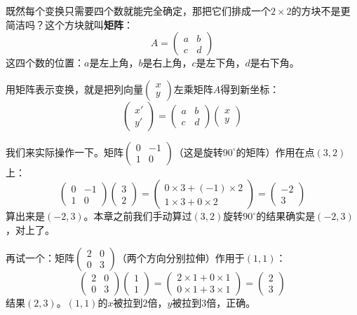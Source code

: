 \documentclass[a4paper,12pt]{ctexart}
\begin{document}
既然每个变换只需要四个数就能完全确定，那把它们排成一个$2\times2$的方块不是更简洁吗？这个方块就叫\textbf{矩阵}：
\[
A = \begin{pmatrix}a&b\\c&d\end{pmatrix}
\]
这四个数的位置：$a$是左上角，$b$是右上角，$c$是左下角，$d$是右下角。

用矩阵表示变换，就是把列向量$\begin{pmatrix}x\\y\end{pmatrix}$左乘矩阵$A$得到新坐标：
\[
\begin{pmatrix}x'\\y'\end{pmatrix}
= \begin{pmatrix}a&b\\c&d\end{pmatrix}
\begin{pmatrix}x\\y\end{pmatrix}
\]

我们来实际操作一下。矩阵$\begin{pmatrix}0&-1\\1&0\end{pmatrix}$（这是旋转$90^\circ$的矩阵）作用在点$(3,2)$上：
\[
\begin{pmatrix}0&-1\\1&0\end{pmatrix}\begin{pmatrix}3\\2\end{pmatrix}
= \begin{pmatrix}0\times3+(-1)\times2\\1\times3+0\times2\end{pmatrix}
= \begin{pmatrix}-2\\3\end{pmatrix}
\]
算出来是$(-2,3)$。本章之前我们手动算过$(3,2)$旋转$90^\circ$的结果确实是$(-2,3)$，对上了。

再试一个：矩阵$\begin{pmatrix}2&0\\0&3\end{pmatrix}$（两个方向分别拉伸）作用于$(1,1)$：
\[
\begin{pmatrix}2&0\\0&3\end{pmatrix}\begin{pmatrix}1\\1\end{pmatrix}
= \begin{pmatrix}2\times1+0\times1\\0\times1+3\times1\end{pmatrix}
= \begin{pmatrix}2\\3\end{pmatrix}
\]
结果$(2,3)$。$(1,1)$的$x$被拉到$2$倍，$y$被拉到$3$倍，正确。
\end{document}
